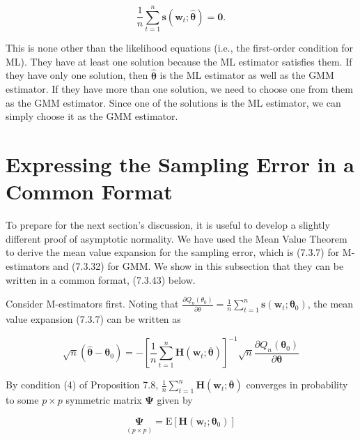 \documentclass[10pt]{article}
\begin{document}
\begin{equation*}
\frac{1}{n} \sum_{t=1}^{n} \mathbf{s}\left(\mathbf{w}_{t} ; \hat{\boldsymbol{\theta}}\right)=\mathbf{0} . \tag{7.3.39}
\end{equation*}


This is none other than the likelihood equations (i.e., the first-order condition for ML). They have at least one solution because the ML estimator satisfies them. If they have only one solution, then $\hat{\boldsymbol{\theta}}$ is the ML estimator as well as the GMM estimator. If they have more than one solution, we need to choose one from them as the GMM estimator. Since one of the solutions is the ML estimator, we can simply choose it as the GMM estimator.

\section*{Expressing the Sampling Error in a Common Format}
To prepare for the next section's discussion, it is useful to develop a slightly different proof of asymptotic normality. We have used the Mean Value Theorem to derive the mean value expansion for the sampling error, which is (7.3.7) for M-estimators and (7.3.32) for GMM. We show in this subsection that they can be written in a common format, (7.3.43) below.

Consider M-estimators first. Noting that $\frac{\partial Q_{n}\left(\theta_{0}\right)}{\partial \theta}=\frac{1}{n} \sum_{t=1}^{n} \mathbf{s}\left(\mathbf{w}_{t} ; \boldsymbol{\theta}_{0}\right)$, the mean value expansion (7.3.7) can be written as


\begin{equation*}
\sqrt{n}\left(\hat{\boldsymbol{\theta}}-\boldsymbol{\theta}_{0}\right)=-\left[\frac{1}{n} \sum_{t=1}^{n} \mathbf{H}\left(\mathbf{w}_{t} ; \overline{\boldsymbol{\theta}}\right)\right]^{-1} \sqrt{n} \frac{\partial Q_{n}\left(\boldsymbol{\theta}_{0}\right)}{\partial \boldsymbol{\theta}} \tag{7.3.40}
\end{equation*}


By condition (4) of Proposition 7.8, $\frac{1}{n} \sum_{t=1}^{n} \mathbf{H}\left(\mathbf{w}_{t} ; \overline{\boldsymbol{\theta}}\right)$ converges in probability to some $p \times p$ symmetric matrix $\boldsymbol{\Psi}$ given by


\begin{equation*}
\underset{(p \times p)}{\boldsymbol{\Psi}}=\mathrm{E}\left[\mathbf{H}\left(\mathbf{w}_{t} ; \boldsymbol{\theta}_{0}\right)\right] \tag{7.3.41}
\end{equation*}
\end{document}
